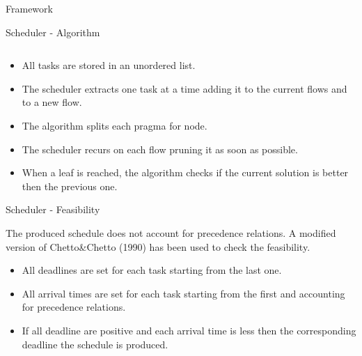 \documentclass[xcolor=dvipsnames]{beamer}
\begin{document}
\begin{section}{Framework}
\begin{frame}{\hskip 0.3cm Scheduler - Algorithm}
\begin{columns}
\end{columns}

\begin{itemize}

\item All tasks are stored in an unordered list.

\item The scheduler extracts one task at a time adding it to the current flows and to a new flow.

\item The algorithm splits each pragma for node.

\item The scheduler recurs on each flow pruning it as soon as possible.

\item When a leaf is reached, the algorithm checks if the current solution is better then the previous one.

\end{itemize}

\end{frame}












\begin{frame}{\hskip 0.3cm Scheduler - Feasibility}

The produced schedule does not account for precedence relations. A modified version of Chetto\&Chetto (1990) has been used to check the feasibility.

\begin{itemize}

\item All deadlines are set for each task starting from the last one.

\item All arrival times are set for each task starting from the first and accounting for precedence relations.

\item If all deadline are positive and each arrival time is less then the corresponding deadline the schedule is produced.

\end{itemize}



\end{frame}








\end{section}
\end{document}
